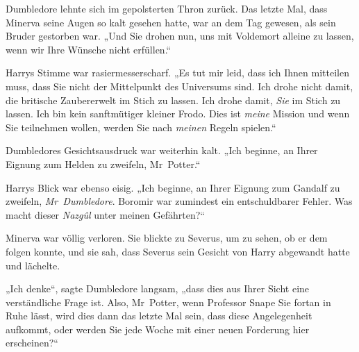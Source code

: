 Dumbledore lehnte sich im gepolsterten Thron zurück. Das letzte Mal, dass Minerva seine Augen so kalt gesehen hatte, war an dem Tag gewesen, als sein Bruder gestorben war.
„Und Sie drohen nun, uns mit Voldemort alleine zu lassen, wenn wir Ihre Wünsche nicht erfüllen.“

Harrys Stimme war rasiermesserscharf.
„Es tut mir leid, dass ich Ihnen mitteilen muss, dass Sie nicht der Mittelpunkt des Universums sind. Ich drohe nicht damit, die britische Zaubererwelt im Stich zu lassen. Ich drohe damit, \emph{Sie} im Stich zu lassen. Ich bin kein sanftmütiger kleiner Frodo. Dies ist \emph{meine} Mission und wenn Sie teilnehmen wollen, werden Sie nach \emph{meinen} Regeln spielen.“

Dumbledores Gesichtsausdruck war weiterhin kalt.
„Ich beginne, an Ihrer Eignung zum Helden zu zweifeln, Mr~Potter.“

Harrys Blick war ebenso eisig.
„Ich beginne, an Ihrer Eignung zum Gandalf zu zweifeln, \emph{Mr~Dumbledore}. Boromir war zumindest ein entschuldbarer Fehler. Was macht dieser \emph{Nazgûl} unter meinen Gefährten?“

Minerva war völlig verloren. Sie blickte zu Severus, um zu sehen, ob er dem folgen konnte, und sie sah, dass Severus sein Gesicht von Harry abgewandt hatte und lächelte.

„Ich denke“, sagte Dumbledore langsam, „dass dies aus Ihrer Sicht eine verständliche Frage ist. Also, Mr~Potter, wenn Professor Snape Sie fortan in Ruhe lässt, wird dies dann das letzte Mal sein, dass diese Angelegenheit aufkommt, oder werden Sie jede Woche mit einer neuen Forderung hier erscheinen?“

